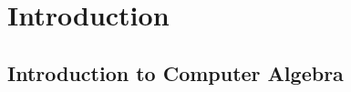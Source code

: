 
\chapter{Introduction}
\label{chap1:introduction}

%
%
%


\section{Introduction to Computer Algebra}
\label{chap1:sec:cas}

